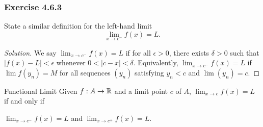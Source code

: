 \subsubsection{Exercise 4.6.3} State a similar definition for the left-hand limit
\[  \lim_{ x \to c^{-} } f(x) = L. \]
\begin{proof}[Solution]
    We say \( \lim_{ x \to c^{-}  } f(x) = L  \) if for all \( \epsilon > 0  \), there exists \( \delta > 0  \) such that \( | f(x) - L  | < \epsilon  \) whenever \( 0 < | c - x  | < \delta  \). Equivalently, \( \lim_{ x \to c^{-} } f(x) = L  \) if \( \lim f(y_n) = M  \) for all sequences \( (y_n)  \) satisfying \( y_n < c  \) and \( \lim (y_n) = c  \).
\end{proof}

\begin{theorem}{Functional Limit}{}
Given \( f: A \to \mathbb{R}  \) and a limit point \( c  \) of \( A  \), \( \lim_{ x \to c  } f(x) = L  \) if and only if 
\begin{center}
    \( \lim_{ x \to c^{-} } f(x) = L  \) and \( \lim_{ x \to c^{+} } f(x) = L  \).
\end{center}
\end{theorem}

